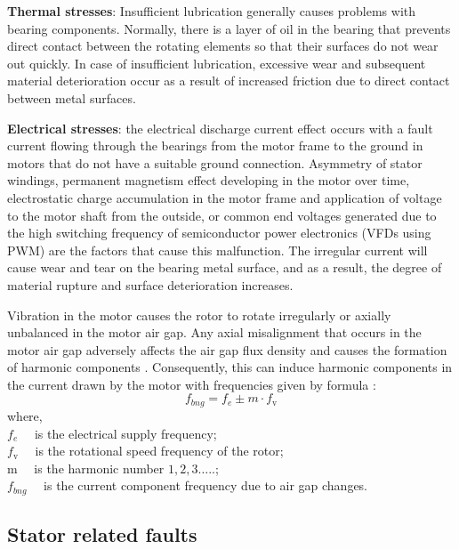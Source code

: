 \textbf{Thermal stresses}: Insufficient lubrication generally causes problems with bearing components. Normally, there is a layer of oil in the bearing that prevents direct contact between the rotating elements so that their surfaces do not wear out quickly. In case of insufficient lubrication, excessive wear and subsequent material deterioration occur as a result of increased friction due to direct contact between metal surfaces.

\textbf{Electrical stresses}: the electrical discharge current effect occurs with a fault current flowing through the bearings from the motor frame to the ground in motors that do not have a suitable ground connection. Asymmetry of stator windings, permanent magnetism effect developing in the motor over time, electrostatic charge accumulation in the motor frame and application of voltage to the motor shaft from the outside, or common end voltages generated due to the high switching frequency of semiconductor power electronics (VFDs using PWM) are the factors that cause this malfunction. The irregular current will cause wear and tear on the bearing metal surface, and as a result, the degree of material rupture and surface deterioration increases.

Vibration in the motor causes the rotor to rotate irregularly or axially unbalanced in the motor air gap. Any axial misalignment that occurs in the motor air gap adversely affects the air gap flux density and causes the formation of harmonic components \cite{schoen1995motor,en201320958,faiz2017fault}. Consequently, this can induce harmonic components in the current drawn by the motor with frequencies given by formula \cite{schoen1995motor}:
\begin{equation}
	f_{bng}=f_{e} \pm m \cdot f_{\mathrm{v}}
	\label{bearingfault}
\end{equation}
where,\\
$f_{e} \quad$ is the electrical supply frequency;\\
$f_{\mathrm{v}} \quad$ is the rotational speed frequency of the rotor;\\
$\mathrm{m} \quad$ is the harmonic number $1,2,3 \ldots$..;\\
$f_{bng} \quad$ is the current component frequency due to air gap changes.

\subsection{Stator related faults}

